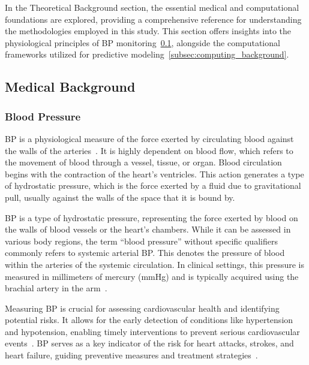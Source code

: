 In the Theoretical Background section, the essential medical and computational foundations are explored, providing a comprehensive reference for understanding the methodologies employed in this study.
This section offers insights into the physiological principles of BP monitoring~\ref{subsec:med_background}, alongside the computational frameworks utilized for predictive modeling~\ref{subsec:computing_background}.

\subsection{Medical Background}
\label{subsec:med_background}

\subsubsection{Blood Pressure}
\label{subsubsec:bp}

BP is a physiological measure of the force exerted by circulating blood against the walls of the arteries~\cite{WhatBloodPressure2019}.
It is highly dependent on blood flow, which refers to the movement of blood through a vessel, tissue, or organ.
Blood circulation begins with the contraction of the heart's ventricles.
This action generates a type of hydrostatic pressure, which is the force exerted by a fluid due to gravitational pull, usually against the walls of the space that it is bound by.

BP is a type of hydrostatic pressure, representing the force exerted by blood on the walls of blood vessels or the heart's chambers.
While it can be assessed in various body regions, the term \enquote{blood pressure} without specific qualifiers commonly refers to systemic arterial BP\@.
This denotes the pressure of blood within the arteries of the systemic circulation.
In clinical settings, this pressure is measured in millimeters of mercury (mmHg) and is typically acquired using the brachial artery in the arm~\cite{betts20BloodFlow2022}.

Measuring BP is crucial for assessing cardiovascular health and identifying potential risks.
It allows for the early detection of conditions like hypertension and hypotension, enabling timely interventions to prevent serious cardiovascular events~\cite{naylorArterialCathetersEarly2020}.
BP serves as a key indicator of the risk for heart attacks, strokes, and heart failure, guiding preventive measures and treatment strategies~\cite{ettehadBloodPressureLowering2016}.


